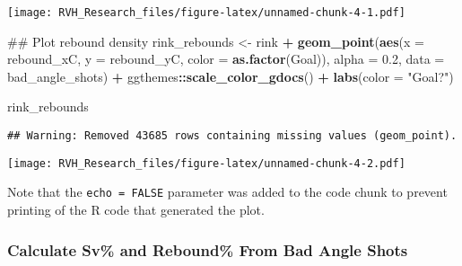 \documentclass[]{article}
\newenvironment{Shaded}{\begin{snugshade}}{\end{snugshade}}
\newcommand{\KeywordTok}[1]{\textcolor[rgb]{0.13,0.29,0.53}{\textbf{#1}}}
\newcommand{\DataTypeTok}[1]{\textcolor[rgb]{0.13,0.29,0.53}{#1}}
\newcommand{\FloatTok}[1]{\textcolor[rgb]{0.00,0.00,0.81}{#1}}
\newcommand{\StringTok}[1]{\textcolor[rgb]{0.31,0.60,0.02}{#1}}
\newcommand{\OperatorTok}[1]{\textcolor[rgb]{0.81,0.36,0.00}{\textbf{#1}}}
\newcommand{\NormalTok}[1]{#1}
\begin{document}
\texttt{[image: RVH\_Research\_files/figure-latex/unnamed-chunk-4-1.pdf]}

\begin{Shaded}
\begin{Highlighting}[]
\NormalTok{## Plot rebound density  }
\NormalTok{rink_rebounds <-}\StringTok{ }\NormalTok{rink }\OperatorTok{+}\StringTok{ }\KeywordTok{geom_point}\NormalTok{(}\KeywordTok{aes}\NormalTok{(}\DataTypeTok{x =}\NormalTok{ rebound_xC, }\DataTypeTok{y =}\NormalTok{ rebound_yC, }\DataTypeTok{color =} \KeywordTok{as.factor}\NormalTok{(Goal)), }\DataTypeTok{alpha =} \FloatTok{0.2}\NormalTok{,}
                  \DataTypeTok{data =}\NormalTok{ bad_angle_shots) }\OperatorTok{+}
\StringTok{        }\NormalTok{ggthemes}\OperatorTok{::}\KeywordTok{scale_color_gdocs}\NormalTok{() }\OperatorTok{+}
\StringTok{        }\KeywordTok{labs}\NormalTok{(}\DataTypeTok{color =} \StringTok{"Goal?"}\NormalTok{)}

\NormalTok{rink_rebounds}
\end{Highlighting}
\end{Shaded}

\begin{verbatim}
## Warning: Removed 43685 rows containing missing values (geom_point).
\end{verbatim}

\texttt{[image: RVH\_Research\_files/figure-latex/unnamed-chunk-4-2.pdf]}

Note that the \texttt{echo\ =\ FALSE} parameter was added to the code
chunk to prevent printing of the R code that generated the plot.

\subsubsection{Calculate Sv\% and Rebound\% From Bad Angle
Shots}\label{calculate-sv-and-rebound-from-bad-angle-shots}
\end{document}
